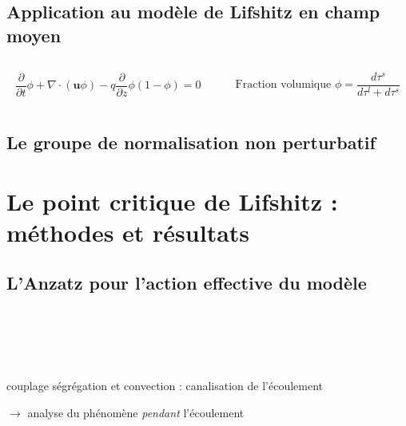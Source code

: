 \documentclass[xcolor=dvipsnames]{beamer}
\newcommand{\p}[2]{\ensuremath{\frac{\partial {#1}}{\partial {#2}}}}
\begin{document}
\subsection{Application au modèle de Lifshitz en champ moyen}
\begin{frame}

\begin{columns}

\begin{column}{6cm}
\[
	\p{}{t} \phi + \nabla \cdot ( \mathbf{u} \phi )  - q \p{}{z} \phi( 1 - \phi) = 0
\]
\end{column}

\begin{column}{6cm}
\[
 \text{Fraction volumique } \phi = \frac{d\tau^s}{d\tau^l + d\tau^s} 
\]
\end{column}

\end{columns}

\end{frame}

\subsection{Le groupe de normalisation non perturbatif}

\section{Le point critique de Lifshitz : méthodes et résultats}
\subsection{L'Anzatz pour l'action effective du modèle}
\begin{frame}

\begin{columns}

\begin{column}{6cm}

\end{column}

\begin{column}{6cm}

\end{column}

\end{columns}

~ \\
~ \\
~ \\
\begin{centering}
couplage ségrégation et convection : canalisation de l'écoulement 
\end{centering}

\begin{centering}
$\rightarrow$ analyse du phénomène \textit{pendant} l'écoulement
\end{centering}
\end{frame}
\end{document}
